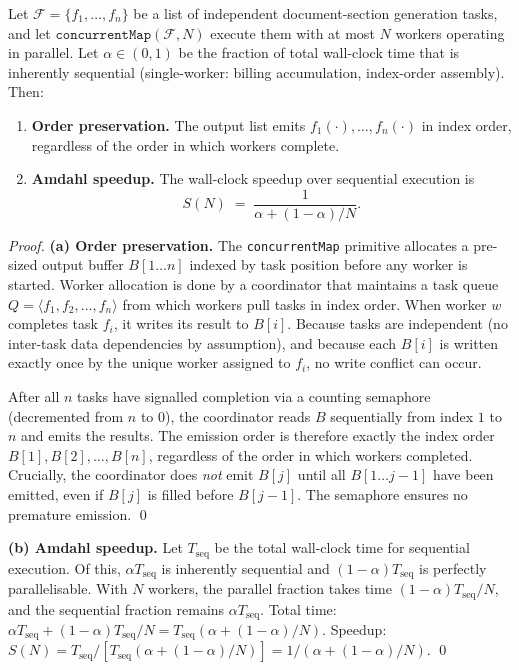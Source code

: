 \begin{theorem}
\label{thm:concurrent}
Let $\mathcal{F}=\{f_1,\ldots,f_n\}$ be a list of independent document-section
generation tasks, and let $\texttt{concurrentMap}(\mathcal{F},N)$ execute them
with at most $N$ workers operating in parallel.
Let $\alpha\in(0,1)$ be the fraction of total wall-clock time that is inherently
sequential (single-worker: billing accumulation, index-order assembly).
Then:
\begin{enumerate}[label=(\alph*)]
  \item \textbf{Order preservation.} The output list emits $f_1(\cdot),\ldots,f_n(\cdot)$
        in index order, regardless of the order in which workers complete.
  \item \textbf{Amdahl speedup.} The wall-clock speedup over sequential execution is
        \[
          S(N) \;=\; \frac{1}{\alpha + (1-\alpha)/N}.
        \]
\end{enumerate}
\end{theorem}

\begin{proof}
\textbf{(a) Order preservation.}
The \texttt{concurrentMap} primitive allocates a pre-sized output buffer
$B[1\ldots n]$ indexed by task position before any worker is started.
Worker allocation is done by a coordinator that maintains a task queue
$Q=\langle f_1,f_2,\ldots,f_n\rangle$ from which workers pull tasks in index order.
When worker $w$ completes task $f_i$, it writes its result to $B[i]$.
Because tasks are independent (no inter-task data dependencies by assumption), and
because each $B[i]$ is written exactly once by the unique worker assigned to $f_i$,
no write conflict can occur.

After all $n$ tasks have signalled completion via a counting semaphore
(decremented from $n$ to $0$), the coordinator reads $B$ sequentially from index
$1$ to $n$ and emits the results.
The emission order is therefore exactly the index order $B[1],B[2],\ldots,B[n]$,
regardless of the order in which workers completed.
Crucially, the coordinator does \emph{not} emit $B[j]$ until all $B[1\ldots j-1]$
have been emitted, even if $B[j]$ is filled before $B[j-1]$.
The semaphore ensures no premature emission. \qed

\textbf{(b) Amdahl speedup.}
Let $T_{\mathrm{seq}}$ be the total wall-clock time for sequential execution.
Of this, $\alpha T_{\mathrm{seq}}$ is inherently sequential and $(1-\alpha)T_{\mathrm{seq}}$
is perfectly parallelisable.
With $N$ workers, the parallel fraction takes time $(1-\alpha)T_{\mathrm{seq}}/N$,
and the sequential fraction remains $\alpha T_{\mathrm{seq}}$.
Total time: $\alpha T_{\mathrm{seq}} + (1-\alpha)T_{\mathrm{seq}}/N
            = T_{\mathrm{seq}}(\alpha + (1-\alpha)/N)$.
Speedup: $S(N) = T_{\mathrm{seq}} / [T_{\mathrm{seq}}(\alpha+(1-\alpha)/N)]
              = 1/(\alpha+(1-\alpha)/N)$. \qed
\end{proof}

